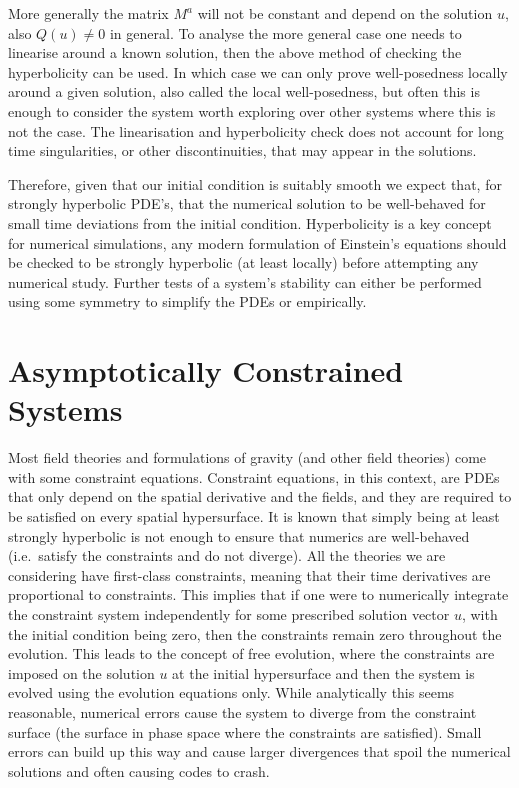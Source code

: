 \documentclass[10pt]{report}
\theoremstyle{definition}
\begin{document}
More generally the matrix $M^a$ will not be constant and depend on the solution $u$, also $Q(u) \neq 0$ in general. To analyse the more general case one needs to linearise around a known solution, then the above method of checking the hyperbolicity can be used. In which case we can only prove well-posedness locally around a given solution, also called the local well-posedness, but often this is enough to consider the system worth exploring over other systems where this is not the case. The linearisation and hyperbolicity check does not account for long time singularities, or other discontinuities, that may appear in the solutions.

Therefore, given that our initial condition is suitably smooth we expect that, for strongly hyperbolic PDE's, that the numerical solution to be well-behaved for small time deviations from the initial condition. Hyperbolicity is a key concept for numerical simulations, any modern formulation of Einstein's equations should be checked to be strongly hyperbolic (at least locally) before attempting any numerical study. Further tests of a system's stability can either be performed using some symmetry to simplify the PDEs or empirically.

\section{Asymptotically Constrained Systems}\label{sec:num-asympytotically-constrained-system}
Most field theories and formulations of gravity (and other field theories) come with some constraint equations. Constraint equations, in this context, are PDEs that only depend on the spatial derivative and the fields, and they are required to be satisfied on every spatial hypersurface. It is known that simply being at least strongly hyperbolic is not enough to ensure that numerics are well-behaved (i.e.\ satisfy the constraints and do not diverge). All the theories we are considering have first-class constraints, meaning that their time derivatives are proportional to constraints. This implies that if one were to numerically integrate the constraint system independently for some prescribed solution vector $u$, with the initial condition being zero, then the constraints remain zero throughout the evolution. This leads to the concept of free evolution, where the constraints are imposed on the solution $u$ at the initial hypersurface and then the system is evolved using the evolution equations only. While analytically this seems reasonable, numerical errors cause the system to diverge from the constraint surface (the surface in phase space where the constraints are satisfied). Small errors can build up this way and cause larger divergences that spoil the numerical solutions and often causing codes to crash.
\end{document}
